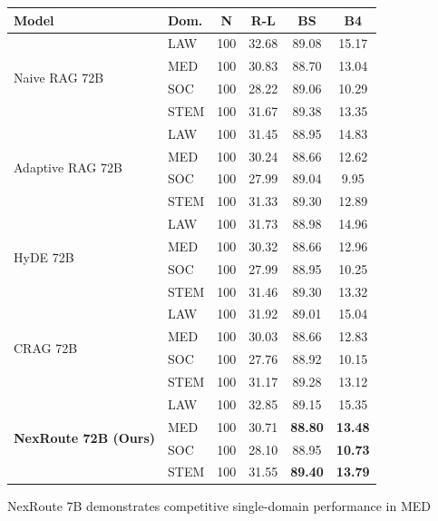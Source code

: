 \documentclass[a4paper,fleql]{cas-sc}
\begin{document}
\vspace{6pt}
\begin{center}
\begingroup
{}
\label{tab:domain_breakdown_72b}
\vspace{4pt}
{\small
\begin{tabular}{llcccc}
\toprule
\textbf{Model} & \textbf{Dom.} & \textbf{N} & \textbf{R-L} & \textbf{BS} & \textbf{B4} \\
\midrule
\multirow{4}{*}{Naive RAG 72B}
  & LAW  & 100 & 32.68 & 89.08 & 15.17 \\
  & MED  & 100 & 30.83 & 88.70 & 13.04 \\
  & SOC  & 100 & 28.22 & 89.06 & 10.29 \\
  & STEM & 100 & 31.67 & 89.38 & 13.35 \\
\midrule
\multirow{4}{*}{Adaptive RAG 72B}
  & LAW  & 100 & 31.45 & 88.95 & 14.83 \\
  & MED  & 100 & 30.24 & 88.66 & 12.62 \\
  & SOC  & 100 & 27.99 & 89.04 &  9.95 \\
  & STEM & 100 & 31.33 & 89.30 & 12.89 \\
\midrule
\multirow{4}{*}{HyDE 72B}
  & LAW  & 100 & 31.73 & 88.98 & 14.96 \\
  & MED  & 100 & 30.32 & 88.66 & 12.96 \\
  & SOC  & 100 & 27.99 & 88.95 & 10.25 \\
  & STEM & 100 & 31.46 & 89.30 & 13.32 \\
\midrule
\multirow{4}{*}{CRAG 72B}
  & LAW  & 100 & 31.92 & 89.01 & 15.04 \\
  & MED  & 100 & 30.03 & 88.66 & 12.83 \\
  & SOC  & 100 & 27.76 & 88.92 & 10.15 \\
  & STEM & 100 & 31.17 & 89.28 & 13.12 \\
\midrule
\multirow{4}{*}{\textbf{NexRoute 72B (Ours)}}
  & LAW  & 100 & 32.85 & 89.15 & 15.35 \\
  & MED  & 100 & 30.71 & \textbf{88.80} & \textbf{13.48} \\
  & SOC  & 100 & 28.10 & 88.95 & \textbf{10.73} \\
  & STEM & 100 & 31.55 & \textbf{89.40} & \textbf{13.79} \\
\bottomrule
\end{tabular}
}
\endgroup
\end{center}
\vspace{4pt}
NexRoute 7B demonstrates competitive single-domain performance in MED
\end{document}
